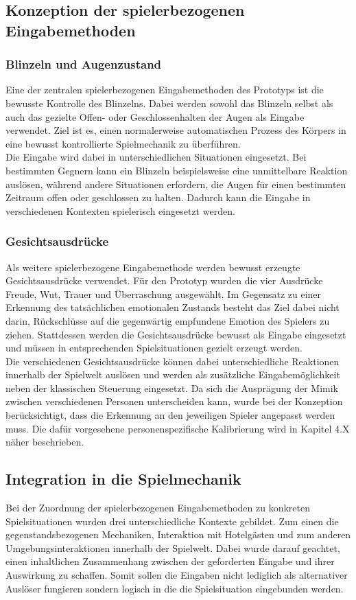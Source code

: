 \documentclass[intern]{cgMA}
\begin{document}
\subsection{Konzeption der spielerbezogenen Eingabemethoden}
\subsubsection{Blinzeln und Augenzustand}
Eine der zentralen spielerbezogenen Eingabemethoden des Prototyps ist die bewusste Kontrolle des Blinzelns. Dabei werden sowohl das Blinzeln selbst als auch das gezielte Offen- oder Geschlossenhalten der Augen als Eingabe verwendet. Ziel ist es, einen normalerweise automatischen Prozess des Körpers in eine bewusst kontrollierte Spielmechanik zu überführen.\\
Die Eingabe wird dabei in unterschiedlichen Situationen eingesetzt. Bei bestimmten Gegnern kann ein Blinzeln beispielsweise eine unmittelbare Reaktion auslösen, während andere Situationen erfordern, die Augen für einen bestimmten Zeitraum offen oder geschlossen zu halten. Dadurch kann die Eingabe in verschiedenen Kontexten spielerisch eingesetzt werden.
\subsubsection{Gesichtsausdrücke}
Als weitere spielerbezogene Eingabemethode werden bewusst erzeugte Gesichtsausdrücke verwendet. Für den Prototyp wurden die vier Ausdrücke Freude, Wut, Trauer und Überraschung ausgewählt. Im Gegensatz zu einer Erkennung des tatsächlichen emotionalen Zustands besteht das Ziel dabei nicht darin, Rückschlüsse auf die gegenwärtig empfundene Emotion des Spielers zu ziehen. Stattdessen werden die Gesichtsausdrücke bewusst als Eingabe eingesetzt und müssen in entsprechenden Spielsituationen gezielt erzeugt werden.\\
Die verschiedenen Gesichtsausdrücke können dabei unterschiedliche Reaktionen innerhalb der Spielwelt auslösen und werden als zusätzliche Eingabemöglichkeit neben der klassischen Steuerung eingesetzt. Da sich die Ausprägung der Mimik zwischen verschiedenen Personen unterscheiden kann, wurde bei der Konzeption berücksichtigt, dass die Erkennung an den jeweiligen Spieler angepasst werden muss. Die dafür vorgesehene personenspezifische Kalibrierung wird in Kapitel 4.X näher beschrieben.
\subsection{Integration in die Spielmechanik}
Bei der Zuordnung der spielerbezogenen Eingabemethoden zu konkreten Spielsituationen wurden drei unterschiedliche Kontexte gebildet. Zum einen die gegenstandsbezogenen Mechaniken, Interaktion mit Hotelgästen und zum anderen Umgebungsinteraktionen innerhalb der Spielwelt. Dabei wurde darauf geachtet, einen inhaltlichen Zusammenhang zwischen der geforderten Eingabe und ihrer Auswirkung zu schaffen. Somit sollen die Eingaben nicht lediglich als alternativer Auslöser fungieren sondern logisch in die die Spielsituation eingebunden werden.
\end{document}
